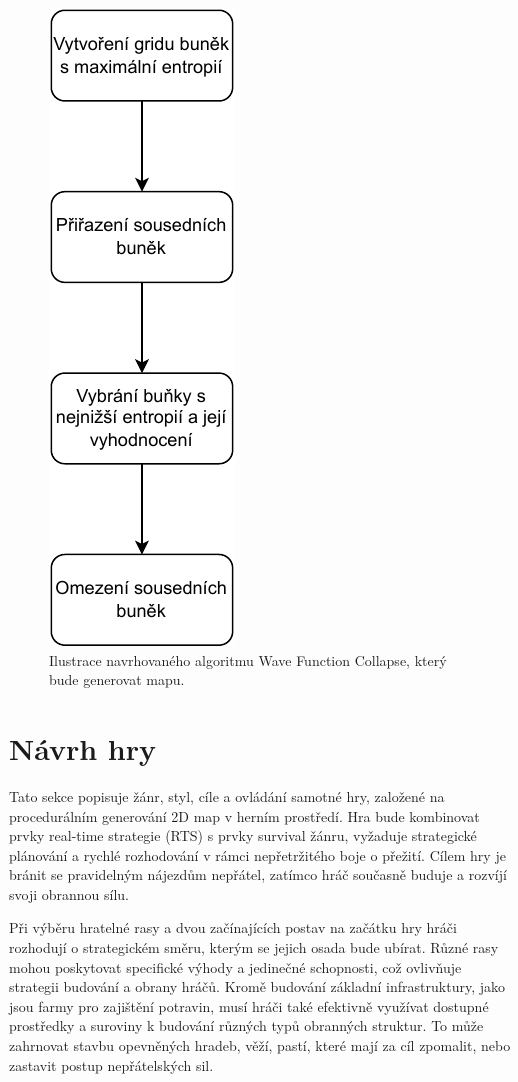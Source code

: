 \begin{figure}[H]
	\centering
	\includegraphics[scale=0.9]{obrazky-figures/wfcAlgorithm.pdf}
	\caption{Ilustrace navrhovaného algoritmu Wave Function Collapse, který bude generovat mapu.}
\end{figure}

\section{Návrh hry}
\label{GameDesign}
Tato sekce popisuje žánr, styl, cíle a ovládání samotné hry, založené na procedurálním generování 2D map v herním prostředí. Hra bude kombinovat prvky real-time strategie (RTS) s prvky survival žánru, vyžaduje strategické plánování a rychlé rozhodování v rámci nepřetržitého boje o přežití. Cílem hry je bránit se pravidelným nájezdům nepřátel, zatímco hráč současně buduje a rozvíjí svoji obrannou sílu.

Při výběru hratelné rasy a dvou začínajících postav na začátku hry hráči rozhodují o strategickém směru, kterým se jejich osada bude ubírat. Různé rasy mohou poskytovat specifické výhody a jedinečné schopnosti, což ovlivňuje strategii budování a obrany hráčů. Kromě budování základní infrastruktury, jako jsou farmy pro zajištění potravin, musí hráči také efektivně využívat dostupné prostředky a suroviny k budování různých typů obranných struktur. To může zahrnovat stavbu opevněných hradeb, věží, pastí, které mají za cíl zpomalit, nebo zastavit postup nepřátelských sil.

